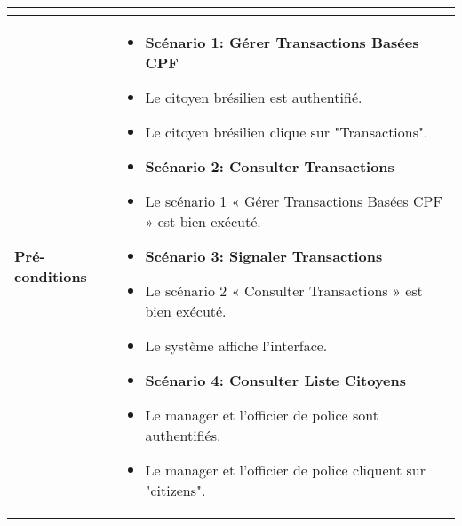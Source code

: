 \begin{longtable}{|>{\arraybackslash}p{4.2cm}|>{\arraybackslash}p{12.5cm}|}
\begin{itemize}[label=]
\end{itemize}\\
\hline
\textbf{Pré-conditions} &
\begin{itemize}[label=]
 \item\textbf{Scénario 1: Gérer Transactions Basées CPF}
  \item Le citoyen brésilien est authentifié.
    \item Le citoyen brésilien clique sur "Transactions".
  \item\textbf{Scénario 2: Consulter Transactions}
  \item Le scénario 1 « Gérer Transactions Basées CPF » est bien exécuté.
  \item\textbf{Scénario 3: Signaler Transactions}
   \item Le scénario 2 « Consulter Transactions » est bien exécuté.
     \item Le système affiche l'interface.
  \item\textbf{Scénario 4: Consulter Liste Citoyens}
  \item Le manager et l'officier de police sont authentifiés.
    \item Le manager et l'officier de police cliquent sur "citizens".


\end{itemize}
\end{longtable}
